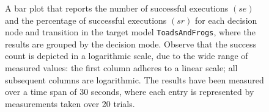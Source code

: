 \begin{figure}[h!]
\centering
\begin{minipage}{1\textwidth}
  \centering
  \makebox[\textwidth][c]{ %
        \resizebox{1.19\textwidth}{!}{ %
            
        }%
    }%
\end{minipage}
\caption{A bar plot that reports the number of successful executions $(se)$ and the percentage of successful executions $(sr)$ for each decision node and transition in the target model \texttt{ToadsAndFrogs}, where the results are grouped by the decision mode. Observe that the success count is depicted in a logarithmic scale, due to the wide range of measured values: the first column adheres to a linear scale; all subsequent columns are logarithmic. The results have been measured over a time span of 30 seconds, where each entry is represented by measurements taken over 20 trials.}
\label{figure:decision_mode_transition_frequency_comparison_toadsandfrogs}
\end{figure}